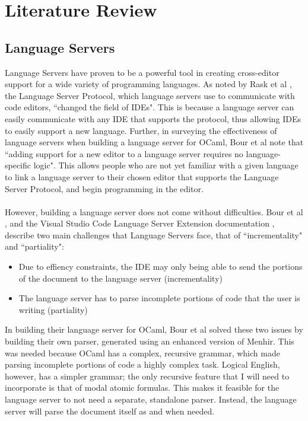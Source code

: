 \documentclass[../main.tex]{subfiles}
\begin{document}
\chapter{Literature Review}
\section{Language Servers}
Language Servers have proven to be a powerful tool in creating cross-editor support for a wide variety of programming languages. As noted by Rask et al \cite[]{standardised_lsp_extensions}, the Language Server Protocol, which language servers use to communicate with code editors, ``changed the field of IDEs". This is because a language server can easily communicate with any IDE that supports the protocol, thus allowing IDEs to easily support a new language. Further, in surveying the effectiveness of language servers when building a language server for OCaml, Bour et al \cite[]{merlin_experience_report} note that ``adding support for a new editor to a language server requires no language-specific logic". This allows people who are not yet familiar with a given language to link a language server to their chosen editor that supports the Language Server Protocol, and begin programming in the editor. 
\\ \\
However, building a language server does not come without difficulties. Bour et al \cite[]{merlin_experience_report}, and the Visual Studio Code Language Server Extension documentation \cite[]{vsc_langserver_docs}, describe two main challenges that Language Servers face, that of ``incrementality" and ``partiality":
\begin{itemize}
    \item Due to effiency constraints, the IDE may only being able to send the portions of the document to the language server (incrementality)
    \item The language server has to parse incomplete portions of code that the user is writing (partiality)
\end{itemize}
In building their language server for OCaml, Bour et al solved these two issues by building their own parser, generated using an enhanced version of Menhir. This was needed because OCaml has a complex, recursive grammar, which made parsing incomplete portions of code a highly complex task. Logical English, however, has a simpler grammar; the only recursive feature that I will need to incorporate is that of modal atomic formulas. This makes it feasible for the language server to not need a separate, standalone parser. Instead, the language server will parse the document itself as and when needed.
\end{document}
